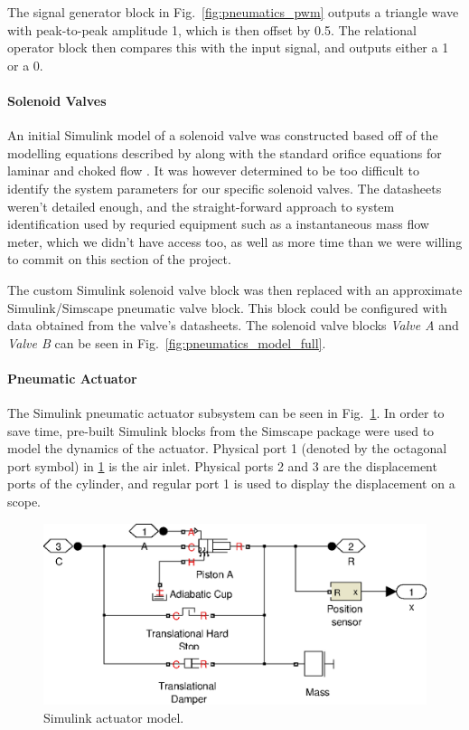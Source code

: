 The signal generator block in Fig.\ \ref{fig:pneumatics_pwm} outputs a triangle wave with peak-to-peak amplitude 1, which is then offset by 0.5. The relational operator block then compares this with the input signal, and outputs either a 1 or a 0.

\paragraph{Solenoid Valves}

An initial Simulink model of a solenoid valve was constructed based off of the modelling equations described by \citet{valve_models} along with the standard orifice equations for laminar and choked flow \cite{fluid_power}. It was however determined to be too difficult to identify the system parameters for our specific solenoid valves. The datasheets weren't detailed enough, and the straight-forward approach to system identification used by \cite{valve_models} requried equipment such as a instantaneous mass flow meter, which we didn't have access too, as well as more time than we were willing to commit on this section of the project.

The custom Simulink solenoid valve block was then replaced with an approximate Simulink/Simscape pneumatic valve block. This block could be configured with data obtained from the valve's datasheets. The solenoid valve blocks \emph{Valve A} and \emph{Valve B} can be seen in Fig.\ \ref{fig:pneumatics_model_full}.

\paragraph{Pneumatic Actuator}

The Simulink pneumatic actuator subsystem can be seen in Fig.\ \ref{fig:pneumatics_actuator}. In order to save time, pre-built Simulink blocks from the Simscape package were used to model the dynamics of the actuator. Physical port 1 (denoted by the octagonal port symbol) in \ref{fig:pneumatics_actuator} is the air inlet. Physical ports 2 and 3 are the displacement ports of the cylinder, and regular port 1 is used to display the displacement on a scope.

\begin{figure}[H]
\centering
\includegraphics[scale=0.65]{implementation/figures/pneumatic_modelling3}
\caption{Simulink actuator model.}
\label{fig:pneumatics_actuator}
\end{figure}


